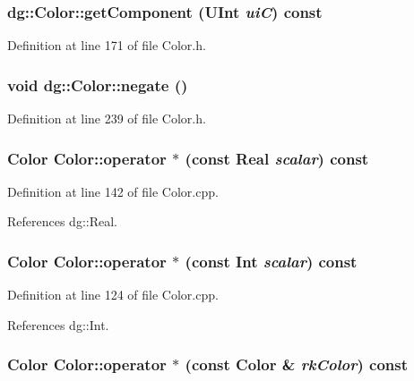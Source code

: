 \subsubsection{ dg::Color::get\-Component ({\bf UInt} {\em ui\-C}) const\hspace{0.3cm}{\tt  [inline]}}\label{classdg_1_1Color_a15}




Definition at line 171 of file Color.h.
\subsubsection{\setlength{\rightskip}{0pt plus 5cm}void dg::Color::negate ()\hspace{0.3cm}{\tt  [inline]}}\label{classdg_1_1Color_a42}




Definition at line 239 of file Color.h.
\subsubsection{\setlength{\rightskip}{0pt plus 5cm}Color Color::operator $\ast$ (const {\bf Real} {\em scalar}) const}\label{classdg_1_1Color_a39}




Definition at line 142 of file Color.cpp.

References dg::Real.
\subsubsection{\setlength{\rightskip}{0pt plus 5cm}Color Color::operator $\ast$ (const {\bf Int} {\em scalar}) const}\label{classdg_1_1Color_a37}




Definition at line 124 of file Color.cpp.

References dg::Int.
\subsubsection{\setlength{\rightskip}{0pt plus 5cm}Color Color::operator $\ast$ (const Color \& {\em rk\-Color}) const}\label{classdg_1_1Color_a35}




